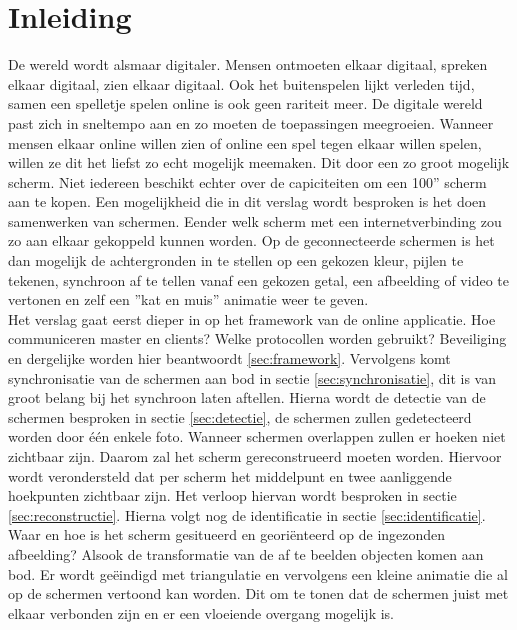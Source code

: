\section{Inleiding}
De wereld wordt alsmaar digitaler. Mensen ontmoeten elkaar digitaal, spreken elkaar digitaal, zien elkaar digitaal. Ook het buitenspelen lijkt verleden tijd, samen een spelletje spelen online is ook geen rariteit meer. De digitale wereld past zich in sneltempo aan en zo moeten de toepassingen meegroeien. Wanneer mensen elkaar online willen zien of online een spel tegen elkaar willen spelen, willen ze dit het liefst zo echt mogelijk meemaken. Dit door een zo groot mogelijk scherm. Niet iedereen beschikt echter over de capiciteiten om een 100'' scherm aan te kopen. Een mogelijkheid die in dit verslag wordt besproken is het doen samenwerken van schermen. Eender welk scherm met een internetverbinding zou zo aan elkaar gekoppeld kunnen worden. Op de geconnecteerde schermen is het dan mogelijk de achtergronden in te stellen op een gekozen kleur, pijlen te tekenen, synchroon af te tellen vanaf een gekozen getal, een afbeelding of video te vertonen en zelf een ''kat en muis'' animatie weer te geven.\\[3mm]
Het verslag gaat eerst dieper in op het framework van de online applicatie. Hoe communiceren master en clients? Welke  protocollen worden gebruikt? Beveiliging en dergelijke worden hier beantwoordt \ref{sec:framework}. Vervolgens komt synchronisatie van de schermen aan bod in sectie \ref{sec:synchronisatie}, dit is van groot belang bij het synchroon laten aftellen. Hierna wordt de detectie van de schermen besproken in sectie \ref{sec:detectie}, de schermen zullen gedetecteerd worden door één enkele foto. Wanneer schermen overlappen zullen er hoeken niet zichtbaar zijn. Daarom zal het scherm gereconstrueerd moeten worden. Hiervoor wordt verondersteld dat per scherm het middelpunt en twee aanliggende hoekpunten zichtbaar zijn. Het verloop hiervan wordt besproken in sectie \ref{sec:reconstructie}. Hierna volgt nog de identificatie in sectie \ref{sec:identificatie}. Waar en hoe is het scherm gesitueerd en georiënteerd op de ingezonden afbeelding? Alsook de transformatie van de af te beelden objecten komen aan bod. Er wordt geëindigd met triangulatie en vervolgens een kleine animatie die al op de schermen vertoond kan worden. Dit om te tonen dat de schermen juist met elkaar verbonden zijn en er een vloeiende overgang mogelijk is. 